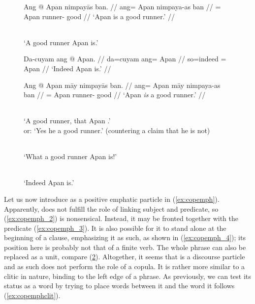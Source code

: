 \begin{figure}
\pex\label{ex:copnoemph}
\a\label{ex:copnoemph_1}\begingl
	\gla Ang @ Apan nimpayās ban. //
	\glb ang= Apan nimpaya-as ban //
	\glc \Aarg{}= Apan runner-\Parg{} good //
	\glft `Apan is a good runner.' //
\endgl

\a\label{ex:copnoemph_2}%
	 \\
	`A good runner Apan is.'

\a\label{ex:copnoemph_3}\begingl
	\gla Da-cuyam ang @ Apan. //
	\glb da=cuyam ang= Apan //
	\glc so=indeed \Aarg{}= Apan //
	\glft `Indeed Apan is.' //
\endgl
\xe
\end{figure}

\begin{figure}
\pex\label{ex:copemph}
\a\label{ex:copemph_1}\begingl
	\gla Ang @ Apan māy nimpayās ban. //
	\glb ang= Apan māy nimpaya-as ban //
	\glc \Aarg{}= Apan \Int{} runner-\Parg{} good //
	\glft `Apan \emph{is} a good runner.' //
\endgl

\a\label{ex:copemph_2}%
	\ljudge*{}

\a\label{ex:copemph_3}%
	 \\
	`A good runner, that Apan .'\\
	or: `Yes he  a good runner.' (countering a claim that he is not)

\a\label{ex:copemph_4}%
	 \\
	`What a good runner Apan is!'

\a\label{ex:copemph_5}%
	 \\
	`Indeed Apan is.'
\xe
\end{figure}

Let us now introduce  as a positive emphatic particle in
(\ref{ex:copemph}). Apparently,  does not fulfill the role
of linking subject and predicate, so (\ref{ex:copemph_2}) is nonsensical.
Instead, it may be fronted together with the predicate
(\ref{ex:copemph_3}). It is also possible for it to stand alone at the
beginning of a clause, emphasizing it as such, as shown in
(\ref{ex:copemph_4}); its position here is probably not that of a finite verb.
The whole phrase  can also be
replaced as a unit, compare (\ref{ex:copemph_5}). Altogether, it seems
that  is a discourse particle and as such does not
perform the role of a copula. It is rather more similar to a clitic in
nature, binding to the left edge of a phrase. As previously, we can test its
status as a word by trying to place words between it and the word it follows (\ref{ex:copemphclit}).

